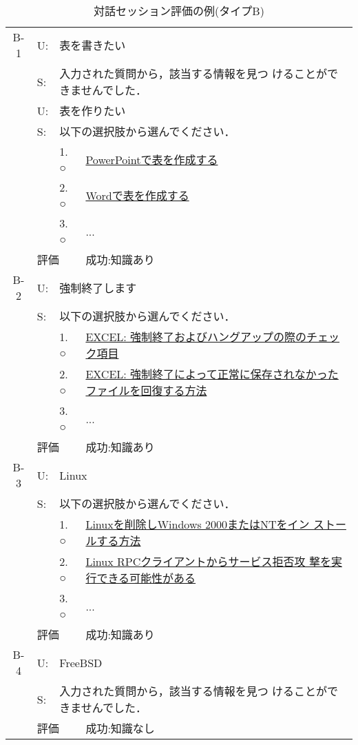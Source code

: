 \begin{table}
 \caption{対話セッション評価の例(タイプB)} \label{tab:対話セッション評価の例(タイプB)}
 \begin{center} \footnotesize
  \begin{tabular}{c|llp{10cm}} \hline
   B-1 & U: & \multicolumn{2}{l}{表を書きたい} \\
       & S: & \multicolumn{2}{l}{入力された質問から，該当する情報を見つ
       けることができませんでした．} \\
       & U: & \multicolumn{2}{l}{表を作りたい} \\
       & S: & \multicolumn{2}{l}{以下の選択肢から選んでください．} \\
       &    & 1. ○ & \underline{PowerPointで表を作成する} \\
       &    & 2. ○ & \underline{Wordで表を作成する} \\
       &    & 3. ○ & ... \\ \cline{2-4}
       & \multicolumn{2}{l}{評価} & 成功:知識あり \\ \hline

   B-2 & U: & \multicolumn{2}{l}{強制終了します} \\
       & S: & \multicolumn{2}{l}{以下の選択肢から選んでください．} \\
       &    & 1. ○ & \underline{EXCEL: 強制終了およびハングアップの際のチェック項目} \\
       &    & 2. ○ & \underline{EXCEL: 強制終了によって正常に保存されなかったファイルを回復する方法} \\
       &    & 3. ○ & ... \\ \cline{2-4}
       & \multicolumn{2}{l}{評価} & 成功:知識あり \\ \hline

   
   B-3 & U: & \multicolumn{2}{l}{Linux} \\
       & S: & \multicolumn{2}{l}{以下の選択肢から選んでください．} \\
       &    & 1. ○ & \underline{Linuxを削除しWindows 2000またはNTをイン
       ストールする方法} \\
       &    & 2. ○ & \underline{Linux RPCクライアントからサービス拒否攻
       撃を実行できる可能性がある} \\
       &    & 3. ○ & ... \\ \cline{2-4}
       & \multicolumn{2}{l}{評価} & 成功:知識あり \\ \hline

   B-4 & U: & \multicolumn{2}{l}{FreeBSD} \\
       & S: & \multicolumn{2}{l}{入力された質問から，該当する情報を見つ
       けることができませんでした．} \\ \cline{2-4}
       & \multicolumn{2}{l}{評価} & 成功:知識なし \\ \hline


\end{tabular}
\end{center}
\end{table}
